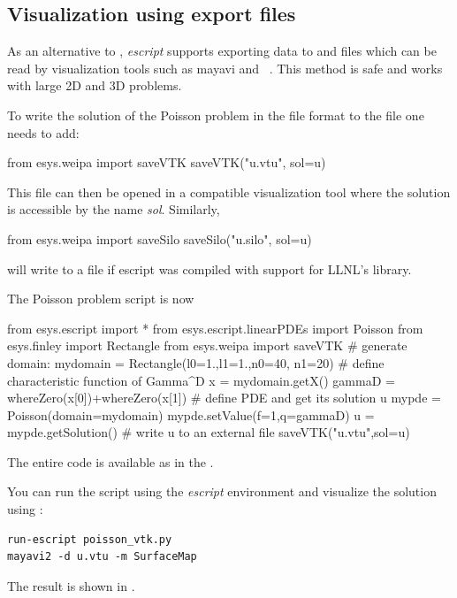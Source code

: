 \subsection{Visualization using export files}

As an alternative to \MATPLOTLIB, {\it escript} supports exporting data to
\VTK and \SILO files which can be read by visualization tools such as
mayavi\cite{mayavi} and \VisIt~\cite{VisIt}. This method is \MPI safe and
works with large 2D and 3D problems.

To write the solution  of the Poisson problem in the \VTK file format
to the file  one needs to add:
\begin{python}
  from esys.weipa import saveVTK
  saveVTK("u.vtu", sol=u)
\end{python}
This file can then be opened in a \VTK compatible visualization tool where the
solution is accessible by the name {\it sol}. Similarly,
\begin{python}
  from esys.weipa import saveSilo
  saveSilo("u.silo", sol=u)
\end{python}
will write  to a \SILO file if escript was compiled with support for
LLNL's \SILO library.

The Poisson problem script is now 
\begin{python}
  from esys.escript import *
  from esys.escript.linearPDEs import Poisson
  from esys.finley import Rectangle
  from esys.weipa import saveVTK
  # generate domain:
  mydomain = Rectangle(l0=1.,l1=1.,n0=40, n1=20)
  # define characteristic function of Gamma^D
  x = mydomain.getX()
  gammaD = whereZero(x[0])+whereZero(x[1])
  # define PDE and get its solution u
  mypde = Poisson(domain=mydomain)
  mypde.setValue(f=1,q=gammaD)
  u = mypde.getSolution()
  # write u to an external file
  saveVTK("u.vtu",sol=u)
\end{python}
The entire code is available as  in the \ExampleDirectory.

You can run the script using the {\it escript} environment and visualize the
solution using \mayavi:
\begin{verbatim}
run-escript poisson_vtk.py
mayavi2 -d u.vtu -m SurfaceMap
\end{verbatim}
The result is shown in .

